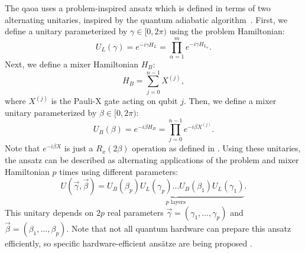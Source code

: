 The \gls{qaoa} uses a problem-inspired ansatz which is defined in terms of two alternating unitaries, inspired by the quantum adiabatic algorithm~\cite{farhi2014quantum}.
First, we define a unitary parameterized by $\gamma \in [0, 2\pi)$ using the problem Hamiltonian:
\begin{equation}
U_L(\gamma) = e^{-i\gamma H_L} = \prod_{\alpha=1}^{m} e^{-i\gamma H_{L_\alpha}}.
\end{equation}
Next, we define a mixer Hamiltonian $H_B$:
\begin{equation}
H_B = \sum_{j=0}^{n-1} X^{(j)},
\end{equation}
where $X^{(j)}$ is the Pauli-X gate acting on qubit $j$.
Then, we define a mixer unitary parameterized by $\beta \in [0, 2\pi)$:
\begin{equation}
U_B(\beta) = e^{-i\beta H_B} = \prod_{j=0}^{n-1} e^{-i\beta X^{(j)}}.
\end{equation}
Note that $e^{-i\beta X}$ is just a $R_x(2\beta)$ operation as defined in .
Using these unitaries, the ansatz can be described as alternating applications of the problem and mixer Hamiltonian $p$ times using different parameters:
\begin{equation}
U(\vec{\gamma}, \vec{\beta}) = \underbrace{U_B(\beta_p)U_L(\gamma_p) \ldots U_B(\beta_1)U_L(\gamma_1)}_{p \:\, \text{layers}}.
\end{equation}
This unitary depends on $2p$ real parameters $\vec{\gamma} = ( \gamma_1,\ldots,\gamma_p )$ and $\vec{\beta} = ( \beta_1,\ldots,\beta_p )$. 
Note that not all quantum hardware can prepare this ansatz efficiently, so specific hardware-efficient ans{\"a}tze are being proposed \cite{kandala2017hardware, farhi2017quantum}.

